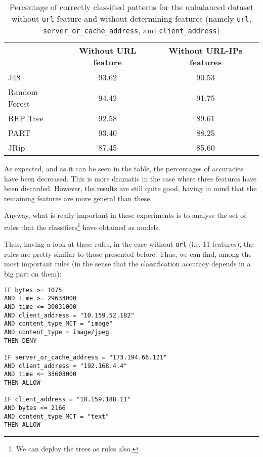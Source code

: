 \documentclass{llncs}
\begin{document}
\begin{table}[htpb]
\centering
 \caption{\label{tab_rules_study_classification} Percentage of correctly classified patterns for the unbalanced dataset without \texttt{url} feature and without determining features (namely \texttt{url}, \texttt{server\_or\_cache\_address}, and \texttt{client\_address})}
{\small
\begin{tabular}{|l|c|c|}
\cline{2-3}
\multicolumn{1}{l|}{} & Without URL feature & Without URL-IPs features\\ 
\hline
J48 & 93.62 & 90.53 \\ 
\cline{1-1}
Random Forest & 94.42 & 91.75 \\
\cline{1-1}
REP Tree & 92.58 & 89.61 \\ 
\cline{1-1}
PART & 93.40 & 88.25 \\ 
\cline{1-1}
JRip & 87.45 & 85.60 \\ 
\hline
\end{tabular}
}
\end{table}


As expected, and as it can be seen in the table, the percentages of accuracies have been decreased. This is more dramatic in the case where three features have been discarded.
However, the results are still quite good, having in mind that the remaining features are more general than these.

Anyway, what is really important in these experiments is to analyse the set of rules that the classifiers\footnote{We can deploy the trees as rules also.} have obtained as models.

Thus, having a look at these rules, in the case without \texttt{url} (i.e. 11 features), the rules are pretty similar to those presented before. Thus, we can find, among the most important rules (in the sense that the classification accuracy depends in a big part on them): 

\begin{small}
\begin{verbatim}
IF bytes >= 1075
AND time >= 29633000
AND time <= 30031000
AND client_address = "10.159.52.182"
AND content_type_MCT = "image"
AND content_type = image/jpeg
THEN DENY

IF server_or_cache_address = "173.194.66.121" 
AND client_address = "192.168.4.4"
AND time <= 33603000
THEN ALLOW

IF client_address = "10.159.188.11"
AND bytes <= 2166 
AND content_type_MCT = "text"
THEN ALLOW
\end{verbatim}
\end{small}
\end{document}
